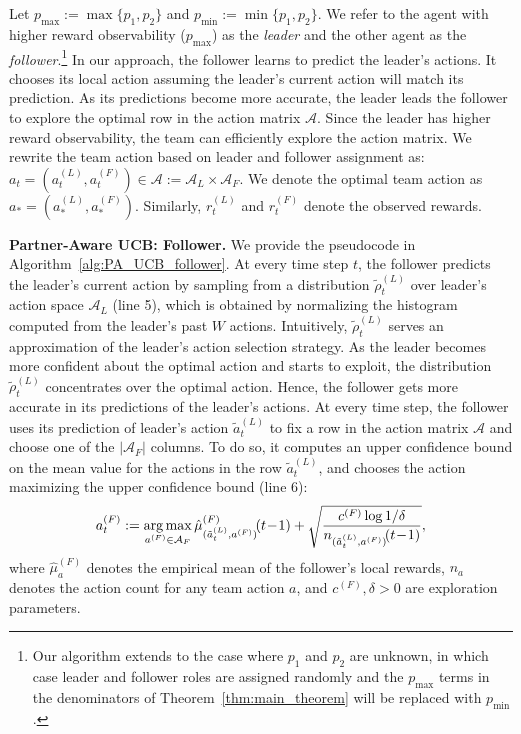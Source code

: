 \documentclass[letterpaper]{article} %
\theoremstyle{definition}
\def\argmax{\mathop{\rm arg\,max}}
\def\mc{\mathcal}
\begin{document}
Let $p_{\text{max}} := \max\{p_1, p_2\}$ and $p_{\text{min}} := \min\{p_1, p_2\}$. We refer to the agent with higher reward observability ($p_{\text{max}}$) as the \textit{leader} and the other agent as the  \textit{follower}.\footnote{Our algorithm extends to the case where $p_1$ and $p_2$ are unknown, in which case leader and follower roles are assigned randomly and the $p_{\text{max}}$ terms in the denominators of Theorem~\ref{thm:main_theorem} will be replaced with $p_{\text{min}}$.} In our approach, the follower learns to predict the leader's actions. It chooses its local action assuming the leader's current action will match its prediction. As its predictions become more accurate, the leader leads the follower to explore the optimal row in the action matrix $\mc{A}$. Since the leader has higher reward observability, the team can efficiently explore the action matrix.
We rewrite the team action based on leader and follower assignment as:
$a_t \!=\! (a^{(L)}_t, a^{(F)}_t) \!\in\! \mc{A}\!:=\! \mc{A}_L\!\times\mc{A}_F$. We denote the optimal team action as $a_{\ast} = (a^{(L)}_{\ast}, a^{(F)}_{\ast})$. Similarly, $r^{(L)}_t$ and $r^{(F)}_t$ denote the observed rewards. %


\smallskip
\noindent \textbf{Partner-Aware UCB: Follower.}
We provide the pseudocode in Algorithm~\ref{alg:PA_UCB_follower}. At every time step $t$, the follower predicts the leader's current action by sampling from a distribution $\tilde{\rho}^{(L)}_t$ over leader's action space $\mc{A}_L$ (line 5), which is obtained by normalizing the histogram computed from the leader's past $W$ actions. Intuitively, $\tilde{\rho}^{(L)}_t$ serves an approximation of the leader's action selection strategy. As the leader becomes more confident about the optimal action and starts to exploit, the distribution $\tilde{\rho}^{(L)}_t$ concentrates over the optimal action. Hence, the follower gets more accurate in its predictions of the leader's actions. At every time step, the follower uses its prediction of leader's action $\tilde{a}^{(L)}_t$ to fix a row in the action matrix $\mc{A}$ and choose one of the $|\mc{A}_F|$ columns. To do so, it computes an upper confidence bound on the mean value for the actions in the row $\tilde{a}^{(L)}_t$, and chooses the action maximizing the upper confidence bound (line 6):
\begin{align*}
    a^{(F)}_t := \argmax_{a^{(F)} \in \mc{A}_F} \hat{\mu}^{(F)}_{(\tilde{a}^{(L)}_t,a^{(F)})}\!(t\!-\!1) + \sqrt{\frac{c^{(F)} \log 1/\delta}{n_{(\tilde{a}^{(L)}_t,a^{(F)})}\!(t\!-\!1)}},
\end{align*}
where $\hat{\mu}^{(F)}_a$ denotes the empirical mean of the follower's local rewards, $n_a$ denotes the action count for any team action $a$, and $c^{(F)},\delta>0$ are exploration parameters.
\end{document}

